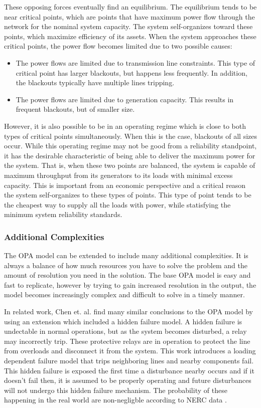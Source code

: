These opposing forces eventually find an equilibrium.  The equilibrium tends to be near critical points, which are points that have maximum power flow through the network for the nominal system capacity.  The system self-organizes toward these points, which maximize efficiency of its assets.  When the system approaches these critical points, the power flow becomes limited due to two possible causes:
\begin{itemize}
\item The power flows are limited due to transmission line constraints.  This type of critical point has larger blackouts, but happens less frequently.  In addition, the blackouts typically have  multiple lines tripping.
\item The power flows are limited due to generation capacity.  This results in frequent blackouts, but of smaller size.
\end{itemize}
However, it is also possible to be in an operating regime which is close to both types of critical points simultaneously.  When this is the case, blackouts of all sizes occur.  While this operating regime may not be good from a reliability standpoint, it has the desirable characteristic of being able to deliver the maximum power for the system.   That is, when these two points are balanced, the system is capable of maximum throughput from its generators to its loads with minimal excess capacity.  This is important from an economic perspective and a critical reason the system self-organizes to these types of points.  This type of point tends to be the cheapest way to supply all the loads with power, while statisfying the minimum system reliability standards.

\subsubsection{Additional Complexities}

The OPA model can be extended to include many additional complexities.  It is always a balance of how much resources you have to solve the problem and the amount of resolution you need in the solution.  The base OPA model is easy and fast to replicate, however by trying to gain increased resolution in the output, the model becomes increasingly complex and difficult to solve in a timely manner.

In related work, Chen et. al. \cite{chen_2005} find many similar conclusions to the OPA model by using an extension which included a hidden failure model.  A hidden failure is undectable in normal operations, but as the system becomes disturbed, a relay may incorrectly trip.  These protective relays are in operation to protect the line from overloads and disconnect it from the system.  This work introduces a loading dependent failure model that trips neighboring lines and nearby components fail.  This hidden failure is exposed the first time a disturbance nearby occurs and if it doesn't fail then, it is assumed to be properly operating and future disturbances will not undergo this hidden failure mechanism.  The probability of these happening in the real world are non-negligble according to NERC data \cite{nerc_dawg}.  

